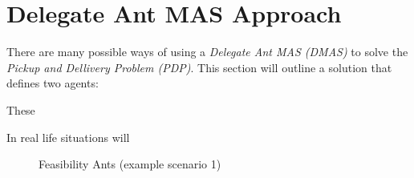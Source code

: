 \section{Delegate Ant MAS Approach}
\label{sec:dmas_algorithm}

\npar There are many possible ways of using a \textit{Delegate Ant MAS (DMAS)}
to solve the \textit{Pickup and Dellivery Problem (PDP)}. This section will
outline a solution that defines two agents:

These 

In real life situations will 


\begin{figure}[!h]
        \vspace{0.5pt}
        \begin{center}
       			\setlength\fboxsep{0.5pt}
				\setlength\fboxrule{0.5pt}
		\end{center}
		\caption{Feasibility Ants (example scenario 1)}
		\label{Fig:Radios}
        \vspace{0.5pt}
\end{figure}

